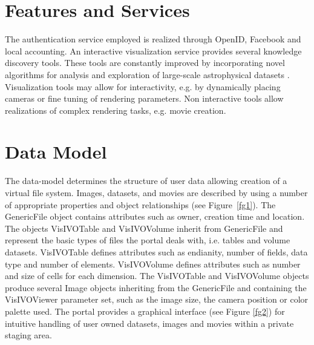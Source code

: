 \section{Features and Services}
The authentication service employed is realized through OpenID, Facebook and local accounting. An interactive visualization service provides several knowledge discovery tools. These tools are constantly improved by incorporating novel algorithms for analysis and exploration of large-scale astrophysical datasets \citep{hassan2011scientific}. Visualization tools may allow for interactivity, e.g. by dynamically placing cameras or fine tuning of rendering parameters. Non interactive tools allow realizations of complex rendering tasks, e.g. movie creation.   

\section{Data Model}
The data-model determines the structure of user data allowing creation of a virtual file system. Images, datasets, and movies are described by using a number of appropriate properties  and object relationships (see Figure~\ref{fg1}). The GenericFile object contains attributes such as owner, creation time and location. The objects VisIVOTable and VisIVOVolume inherit from GenericFile and represent the basic types of files the portal deals with, i.e. tables and volume datasets. VisIVOTable defines attributes such as endianity, number of fields, data type and number of elements. VisIVOVolume defines attributes such as number and size of cells for each dimension. The VisIVOTable and VisIVOVolume objects produce several Image objects inheriting from the GenericFile and containing the VisIVOViewer parameter set, such as the image size, the camera position or color palette used. The portal provides a graphical interface (see Figure \ref{fg2}) for intuitive handling of user owned datasets, images and movies within a private staging area.

